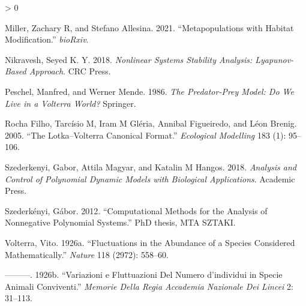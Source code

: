 \documentclass{article}
\newlength{\cslhangindent}
\newenvironment{CSLReferences}[2] %
 {%
  \setlength{\parindent}{0pt}
  \ifodd #1 \everypar{\setlength{\hangindent}{\cslhangindent}}\ignorespaces\fi
  \ifnum #2 > 0
  \setlength{\parskip}{#2\baselineskip}
  \fi
 }%
 {}
\begin{document}
\begin{CSLReferences}{1}{0}
\leavevmode\hypertarget{ref-miller2021metapopulations}{}%
Miller, Zachary R, and Stefano Allesina. 2021. {``Metapopulations with
Habitat Modification.''} \emph{bioRxiv}.

\leavevmode\hypertarget{ref-nikravesh2018nonlinear}{}%
Nikravesh, Seyed K. Y. 2018. \emph{Nonlinear Systems Stability Analysis:
Lyapunov-Based Approach}. CRC Press.

\leavevmode\hypertarget{ref-peschel1986predator}{}%
Peschel, Manfred, and Werner Mende. 1986. \emph{The Predator-Prey Model:
Do We Live in a Volterra World?} Springer.

\leavevmode\hypertarget{ref-rocha2005lotka}{}%
Rocha Filho, Tarcísio M, Iram M Gléria, Annibal Figueiredo, and Léon
Brenig. 2005. {``The Lotka--Volterra Canonical Format.''}
\emph{Ecological Modelling} 183 (1): 95--106.

\leavevmode\hypertarget{ref-szederkenyi2018analysis}{}%
Szederkenyi, Gabor, Attila Magyar, and Katalin M Hangos. 2018.
\emph{Analysis and Control of Polynomial Dynamic Models with Biological
Applications}. Academic Press.

\leavevmode\hypertarget{ref-szederkenyi2012computational}{}%
Szederkényi, Gábor. 2012. {``Computational Methods for the Analysis of
Nonnegative Polynomial Systems.''} PhD thesis, MTA SZTAKI.

\leavevmode\hypertarget{ref-volterra1926fluctuations}{}%
Volterra, Vito. 1926a. {``Fluctuations in the Abundance of a Species
Considered Mathematically.''} \emph{Nature} 118 (2972): 558--60.

\leavevmode\hypertarget{ref-volterra1926variazioni}{}%
---------. 1926b. {``Variazioni e Fluttuazioni Del Numero d'individui in
Specie Animali Conviventi.''} \emph{Memorie Della Regia Accademia
Nazionale Dei Lincei} 2: 31--113.

\end{CSLReferences}



\end{document}
